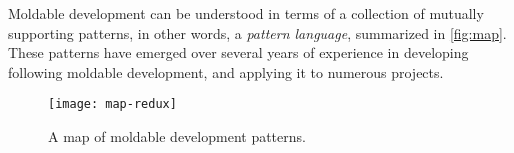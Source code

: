 \documentclass[sigconf,screen]{acmart}
\newcommand\kh[1]{\nbc{Konrad}{#1}{violet}}
\newcommand\eog[1]{\nbc{Edward}{#1}{purple}}
\newcommand\cp[1]{\nbe{Cesare}{#1}{olive}} %
\newcommand\dd[1]{\nbe{Daniel}{#1}{magenta}} %
\newcommand\ws[1]{\nbe{Workshop}{#1}{teal}} %
\newcommand{\GT}{\lst{GT}\xspace} %
\begin{document}

Moldable development can be understood in terms of a collection of mutually supporting 
patterns, in other words, a \emph{pattern language}, summarized in \autoref{fig:map}.
These patterns have emerged over several years of experience in developing \GT following moldable development, and applying it to numerous projects.

\begin{figure}[h]
  \texttt{[image: map-redux]}
  \caption{A map of moldable development patterns.
  }
  \label{fig:map}
\end{figure}




\end{document}
